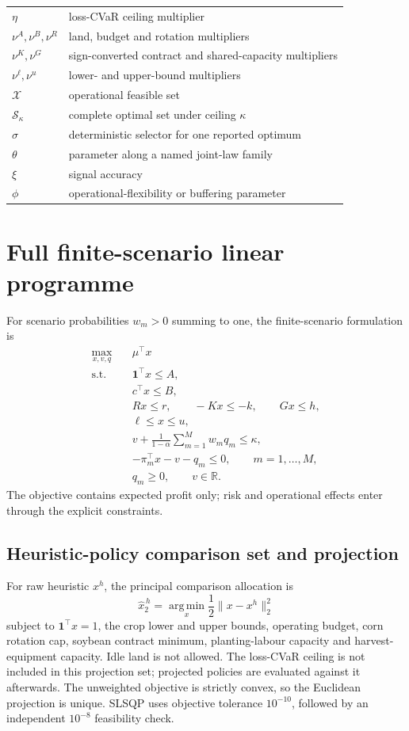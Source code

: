 \documentclass[11pt]{article}
\newcommand{\R}{\mathbb R}
\newcommand{\ind}{\mathbf 1}
\begin{document}
\begin{longtable}{p{2.2cm}p{11.8cm}}
\(\eta\) & loss-CVaR ceiling multiplier\\
\(\nu^A,\nu^B,\nu^R\) & land, budget and rotation multipliers\\
\(\nu^K,\nu^G\) & sign-converted contract and shared-capacity multipliers\\
\(\nu^\ell,\nu^u\) & lower- and upper-bound multipliers\\
\(\mathcal X\) & operational feasible set\\
\(\mathcal S_\kappa\) & complete optimal set under ceiling \(\kappa\)\\
\(\sigma\) & deterministic selector for one reported optimum\\
\(\theta\) & parameter along a named joint-law family\\
\(\xi\) & signal accuracy\\
\(\phi\) & operational-flexibility or buffering parameter\\
\bottomrule
\end{longtable}

\section{Full finite-scenario linear programme}

For scenario probabilities \(w_m>0\) summing to one, the finite-scenario
formulation is
\begin{align}
\max_{x,v,q}\quad & \mu^\top x\\
\text{s.t.}\quad
&\ind^\top x\le A,\\
&c^\top x\le B,\\
&Rx\le r,\qquad -Kx\le-k,\qquad Gx\le h,\\
&\ell\le x\le u,\\
&v+\frac{1}{1-\alpha}\sum_{m=1}^M w_mq_m\le\kappa,\\
&-\pi_m^\top x-v-q_m\le0,\qquad m=1,\ldots,M,\\
&q_m\ge0,\qquad v\in\R.
\end{align}
The objective contains expected profit only; risk and operational effects
enter through the explicit constraints.

\subsection{Heuristic-policy comparison set and projection}

For raw heuristic \(x^h\), the principal comparison allocation is
\[
\widehat x^{\,h}_2
=\operatorname*{arg\,min}_x\frac12\lVert x-x^h\rVert_2^2
\]
subject to \(\ind^\top x=1\), the crop lower and upper bounds, operating
budget, corn rotation cap, soybean contract minimum, planting-labour capacity
and harvest-equipment capacity. Idle land is not allowed. The loss-CVaR ceiling is
not included in this projection set; projected policies are evaluated against
it afterwards. The unweighted objective is strictly convex, so the Euclidean
projection is unique. SLSQP uses objective tolerance \(10^{-10}\), followed by
an independent \(10^{-8}\) feasibility check.
\end{document}

